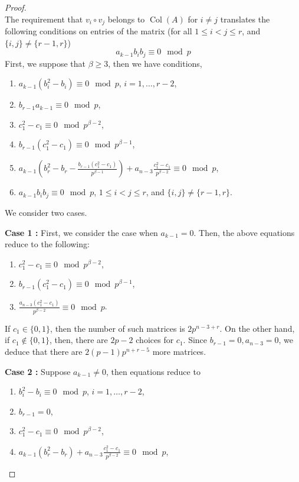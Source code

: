 \documentclass[a4paper]{amsart}
\numberwithin{equation}{section}
\theoremstyle{remark}
\newcommand{\op}[1]{\operatorname{#1}}
\begin{document}
\begin{proof}
\begin{equation}
\end{equation}
The requirement that $v_i\circ v_j$ belongs to $\op{Col}(A)$ for $i\neq j$ translates the following conditions on entries of the matrix (for all $1 \leq i < j \leq r$, and $\{i,j\} \neq \{r-1,r\}$)
\begin{equation*}
    a_{k-1}b_ib_j \equiv 0 \mod p
\end{equation*}
First, we suppose that $\beta \geq 3$, then we have conditions,
\begin{enumerate}
    \item $a_{k-1}(b_i^2-b_i) \equiv 0 \mod{p}$, $i=1,\dots,r-2$,
    \item $b_{r-1}a_{k-1} \equiv 0 \mod p$,
    \item $c_1^2-c_1 \equiv 0 \mod p^{\beta-2}$,
    \item $b_{r-1}(c_1^2-c_1) \equiv 0 \mod p^{\beta-1}$,
    \item $a_{k-1}\left(b_r^2-b_r-\frac{b_{r-1}(c_1^2-c_1)}{p^{\beta-1}}\right)+a_{n-3}\frac{c_1^2-c_1}{p^{\beta-2}} \equiv 0 \mod p$,
    \item $a_{k-1}b_ib_j \equiv 0 \mod p$, $1 \leq i < j \leq r$, and $\{i,j\} \neq \{r-1,r\}$.
\end{enumerate}
We consider two cases.
\par \textbf{Case 1 :} First, we consider the case when $a_{k-1} = 0$. Then, the above equations reduce to the following:
\begin{enumerate}
    \item $c_1^2-c_1 \equiv 0 \mod p^{\beta-2}$,
    \item $b_{r-1}(c_1^2-c_1) \equiv 0 \mod p^{\beta-1}$,
    \item $\frac{a_{n-3}(c_1^2-c_1)}{p^{\beta-2}} \equiv 0 \mod p$.
\end{enumerate}
If $c_1 \in \{0,1\}$, then the number of such matrices is $2p^{n-3+r}$. On the other hand, if $c_1 \notin \{0,1\}$, then, there are $2p-2$ choices for $c_1$. Since $b_{r-1} = 0, a_{n-3}=0$, we deduce that there are $2(p-1)p^{n+r-5}$ more matrices.
\par \textbf{Case 2 :} Suppose $a_{k-1} \neq 0$, then equations reduce to
\begin{enumerate}
\item $b_i^2-b_i \equiv 0 \mod p$, $i =1, \dots, r-2$,
\item $b_{r-1}=0$,
\item $c_1^2-c_1 \equiv 0 \mod p^{\beta-2}$,
\item $a_{k-1}\left(b_r^2-b_r\right)+a_{n-3}\frac{c_1^2-c_1}{p^{\beta-2}} \equiv 0 \mod p$,

\end{enumerate}
\end{proof}
\end{document}
